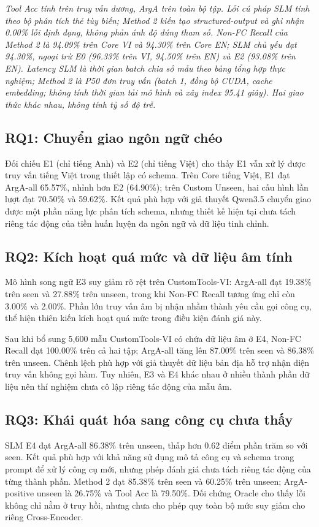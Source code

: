 \documentclass[10pt,twocolumn,a4paper]{article}
\begin{document}
\textit{Tool Acc tính trên truy vấn dương, ArgA trên toàn bộ tập. Lỗi cú pháp SLM tính theo bộ phân tích thẻ tùy biến; Method 2 kiến tạo structured-output và ghi nhận 0.00\% lỗi định dạng, không phản ánh độ đúng tham số. Non-FC Recall của Method 2 là 94.09\% trên Core VI và 94.30\% trên Core EN; SLM chủ yếu đạt 94.30\%, ngoại trừ E0 (96.33\% trên VI, 94.50\% trên EN) và E2 (93.08\% trên EN). Latency SLM là thời gian batch chia số mẫu theo bảng tổng hợp thực nghiệm; Method 2 là P50 đơn truy vấn (batch 1, đồng bộ CUDA, cache embedding; không tính thời gian tải mô hình và xây index 95.41 giây). Hai giao thức khác nhau, không tính tỷ số độ trễ.}


\subsection{RQ1: Chuyển giao ngôn ngữ chéo}
Đối chiếu E1 (chỉ tiếng Anh) và E2 (chỉ tiếng Việt) cho thấy E1 vẫn xử lý được truy vấn tiếng Việt trong thiết lập có schema. Trên Core tiếng Việt, E1 đạt ArgA-all 65.57\%, nhỉnh hơn E2 (64.90\%); trên Custom Unseen, hai cấu hình lần lượt đạt 70.50\% và 59.62\%. Kết quả phù hợp với giả thuyết Qwen3.5 chuyển giao được một phần năng lực phân tích schema, nhưng thiết kế hiện tại chưa tách riêng tác động của tiền huấn luyện đa ngôn ngữ và dữ liệu tinh chỉnh.

\subsection{RQ2: Kích hoạt quá mức và dữ liệu âm tính}
Mô hình song ngữ E3 suy giảm rõ rệt trên CustomTools-VI: ArgA-all đạt 19.38\% trên seen và 27.88\% trên unseen, trong khi Non-FC Recall tương ứng chỉ còn 3.00\% và 2.00\%. Phần lớn truy vấn âm bị nhận nhầm thành yêu cầu gọi công cụ, thể hiện thiên kiến kích hoạt quá mức trong điều kiện đánh giá này.

Sau khi bổ sung 5,600 mẫu CustomTools-VI có chứa dữ liệu âm ở E4, Non-FC Recall đạt 100.00\% trên cả hai tập; ArgA-all tăng lên 87.00\% trên seen và 86.38\% trên unseen. Chênh lệch phù hợp với giả thuyết dữ liệu bản địa hỗ trợ nhận diện truy vấn không gọi hàm. Tuy nhiên, E3 và E4 khác nhau ở nhiều thành phần dữ liệu nên thí nghiệm chưa cô lập riêng tác động của mẫu âm.

\subsection{RQ3: Khái quát hóa sang công cụ chưa thấy}
SLM E4 đạt ArgA-all 86.38\% trên unseen, thấp hơn 0.62 điểm phần trăm so với seen. Kết quả phù hợp với khả năng sử dụng mô tả công cụ và schema trong prompt để xử lý công cụ mới, nhưng phép đánh giá chưa tách riêng tác động của từng thành phần. Method 2 đạt 85.38\% trên seen và 60.25\% trên unseen; ArgA-positive unseen là 26.75\% và Tool Acc là 79.50\%. Đối chứng Oracle cho thấy lỗi không chỉ nằm ở truy hồi, nhưng chưa cho phép quy toàn bộ mức suy giảm cho riêng Cross-Encoder.
\end{document}
